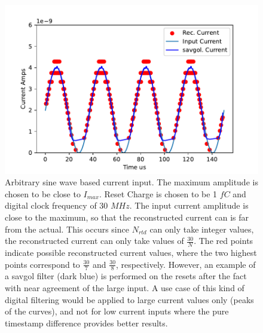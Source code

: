 \begin{figure}[]
\centering
\includegraphics[width=\textwidth]{images/savgol.pdf}
\caption{Arbitrary sine wave based current input.
The maximum amplitude is chosen to be close to $I_{max}$.
Reset Charge is chosen to be 1 $\unit{fC}$ and digital clock frequency of 30 $\unit{MHz}$.
The input current amplitude is close to the maximum, so that the reconstructed current can is far from the actual.
This occurs since $N_{rtd}$ can only take integer values, the reconstructed current can only take values of $\frac{30}{N}$.
The red points indicate possible reconstructed current values, where the two highest points correspond to $\frac{30}{7}$ and $\frac{30}{8}$, respectively.
However, an example of a savgol filter (dark blue) is performed on the resets after the fact with near agreement of the large input.
A use case of this kind of digital filtering would be applied to large current values only (peaks of the curves), and not for low current inputs where the pure timestamp difference provides better results.}
\label{fig:savgol}
\end{figure}

